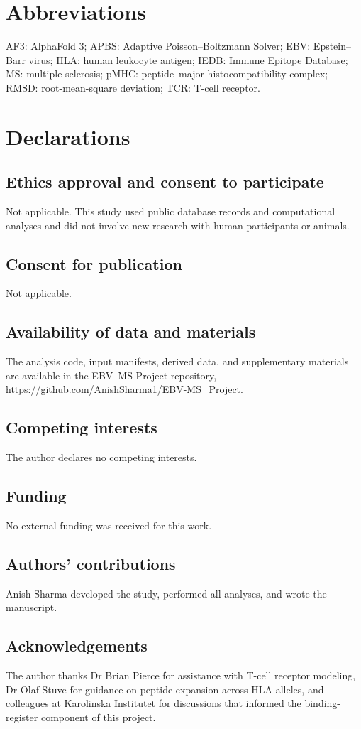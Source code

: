 \documentclass[11pt]{article}
\begin{document}
\section{Abbreviations}
AF3: AlphaFold 3; APBS: Adaptive Poisson--Boltzmann Solver; EBV: Epstein--Barr virus; HLA: human leukocyte antigen; IEDB: Immune Epitope Database; MS: multiple sclerosis; pMHC: peptide--major histocompatibility complex; RMSD: root-mean-square deviation; TCR: T-cell receptor.

\section{Declarations}
\subsection{Ethics approval and consent to participate}
Not applicable. This study used public database records and computational analyses and did not involve new research with human participants or animals.

\subsection{Consent for publication}
Not applicable.

\subsection{Availability of data and materials}
The analysis code, input manifests, derived data, and supplementary materials are available in the EBV--MS Project repository, \url{https://github.com/AnishSharma1/EBV-MS_Project}.

\subsection{Competing interests}
The author declares no competing interests.

\subsection{Funding}
No external funding was received for this work.

\subsection{Authors' contributions}
Anish Sharma developed the study, performed all analyses, and wrote the manuscript.

\subsection{Acknowledgements}
The author thanks Dr Brian Pierce for assistance with T-cell receptor modeling, Dr Olaf Stuve for guidance on peptide expansion across HLA alleles, and colleagues at Karolinska Institutet for discussions that informed the binding-register component of this project.

\FloatBarrier

\end{document}
